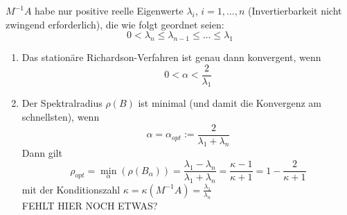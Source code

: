 \begin{satz}
  $M^{-1}A$ habe nur positive reelle Eigenwerte $\lambda_i$, $i=1,\dots, n$ (Invertierbarkeit nicht zwingend erforderlich), die wie folgt geordnet seien:
  \begin{equation*}
    0< \lambda_n \leq \lambda_{n-1} \leq \dots \leq \lambda_1
  \end{equation*}

  \begin{enumerate}[1)]
    \item  Das stationäre Richardson-Verfahren ist genau dann konvergent, wenn 
             \begin{equation*}
                0 < \alpha < \frac{2}{\lambda_1}
              \end{equation*}

    \item Der Spektralradius $\rho(B)$ ist minimal (und damit die Konvergenz am schnellsten), wenn 
      \begin{equation*}
        \alpha = \alpha_{opt} := \frac{2}{\lambda_1+\lambda_n}
      \end{equation*}
      Dann gilt
      \begin{equation*}
        \rho_{opt} = \min_{\alpha} \left( \rho(B_\alpha) \right) 
                   = \frac{\lambda_1-\lambda_n}{\lambda_1+\lambda_n} 
                   = \frac{\kappa - 1}{\kappa+1}= 1 - \frac{2}{\kappa+1}
      \end{equation*}
      mit der Konditionszahl $\kappa = \kappa(M^{-1}A) = \frac{\lambda_1}{\lambda_n}$\\
    FEHLT HIER NOCH ETWAS?
  \end{enumerate}
 \end{satz}

